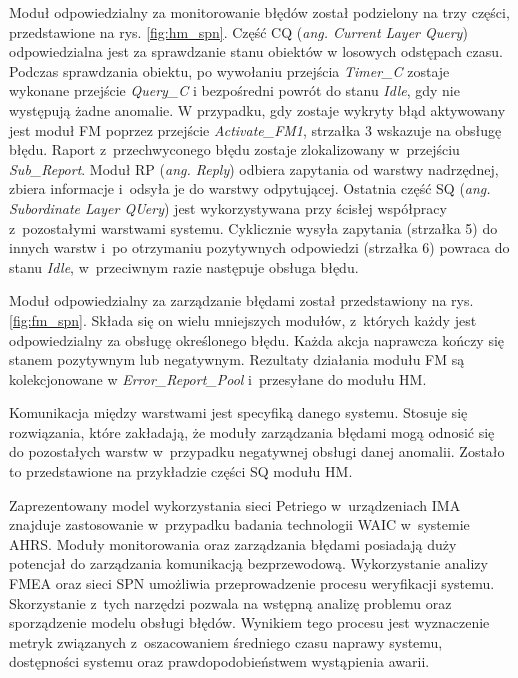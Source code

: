 \documentclass[a4paper, 12pt, twoside]{article}
\begin{document}
Moduł odpowiedzialny za monitorowanie błędów został podzielony na trzy części, przedstawione na rys. \ref{fig:hm_spn}. Część CQ (\textit{ang. Current Layer Query}) odpowiedzialna jest za sprawdzanie stanu obiektów w losowych odstępach czasu. Podczas sprawdzania obiektu, po wywołaniu przejścia \textit{Timer\_C} zostaje wykonane przejście \textit{Query\_C} i bezpośredni powrót do stanu \textit{Idle}, gdy nie występują żadne anomalie. W przypadku, gdy zostaje wykryty błąd aktywowany jest moduł FM poprzez przejście \textit{Activate\_FM1}, strzałka 3 wskazuje na obsługę błędu. Raport z~przechwyconego błędu zostaje zlokalizowany w~przejściu \textit{Sub\_Report}. Moduł RP (\textit{ang. Reply}) odbiera zapytania od warstwy nadrzędnej, zbiera informacje i~odsyła je do warstwy odpytującej. Ostatnia część SQ (\textit{ang. Subordinate Layer QUery}) jest wykorzystywana przy ścisłej współpracy z~pozostałymi warstwami systemu. Cyklicznie wysyła zapytania (strzałka 5) do innych warstw i~po otrzymaniu pozytywnych odpowiedzi (strzałka 6) powraca do stanu \textit{Idle}, w~przeciwnym razie następuje obsługa błędu.

Moduł odpowiedzialny za zarządzanie błędami został przedstawiony na rys. \ref{fig:fm_spn}. Składa się on wielu mniejszych modułów, z~których każdy jest odpowiedzialny za obsługę określonego błędu. Każda akcja naprawcza kończy się stanem pozytywnym lub negatywnym. Rezultaty działania modułu FM są kolekcjonowane w \textit{Error\_Report\_Pool} i~przesyłane do modułu HM.

Komunikacja między warstwami jest specyfiką danego systemu. Stosuje się rozwiązania, które zakładają, że moduły zarządzania błędami mogą odnosić się do pozostałych warstw w~przypadku negatywnej obsługi danej anomalii. Zostało to przedstawione na przykładzie części SQ modułu HM.

Zaprezentowany model wykorzystania sieci Petriego w~urządzeniach IMA znajduje zastosowanie w~przypadku badania technologii WAIC w~systemie AHRS. Moduły monitorowania oraz zarządzania błędami posiadają duży potencjał do zarządzania komunikacją bezprzewodową. 
Wykorzystanie analizy FMEA oraz sieci SPN umożliwia przeprowadzenie procesu weryfikacji systemu. Skorzystanie z~tych narzędzi pozwala na wstępną analizę problemu oraz sporządzenie modelu obsługi błędów. Wynikiem tego procesu jest wyznaczenie metryk związanych z~oszacowaniem średniego czasu naprawy systemu, dostępności systemu oraz prawdopodobieństwem wystąpienia awarii.
\end{document}
